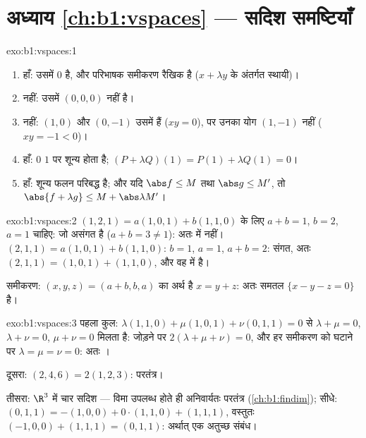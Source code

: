 \section*{अध्याय \ref{ch:b1:vspaces} --- सदिश समष्टियाँ}

\begin{solution}{exo:b1:vspaces:1}
\begin{enumerate}
  \item हाँ: उसमें $0$ है, और परिभाषक समीकरण रैखिक है ($x + \lambda y$ के
  अंतर्गत स्थायी)।
  \item नहीं: उसमें $(0,0,0)$ नहीं है।
  \item नहीं: $(1, 0)$ और $(0, -1)$ उसमें हैं ($xy = 0$), पर उनका योग $(1,
  -1)$ नहीं ($xy = -1 < 0$)।
  \item हाँ: $0$ $1$ पर शून्य होता है; $(P + \lambda Q)(1) = P(1) + \lambda
  Q(1) = 0$।
  \item हाँ: शून्य फलन परिबद्ध है; और यदि $\abs f \leq M$ तथा $\abs g \leq
  M'$, तो $\abs{f + \lambda g} \leq M + \abs\lambda M'$।
\end{enumerate}
\end{solution}

\begin{solution}{exo:b1:vspaces:2}
$(1,2,1) = a(1,0,1) + b(1,1,0)$ के लिए $a + b = 1$, $b = 2$, $a = 1$ चाहिए:
जो असंगत है ($a + b = 3 \neq 1$): अतः  में नहीं। $(2,1,1) =
a(1,0,1) + b(1,1,0)$: $b = 1$, $a = 1$, $a + b = 2$: संगत, अतः $(2,1,1) =
(1,0,1) + (1,1,0)$, और वह  में है।

समीकरण: $(x, y, z) = (a + b, b, a)$ का अर्थ है $x = y + z$: अतः 
समतल $\{x - y - z = 0\}$ है।
\end{solution}

\begin{solution}{exo:b1:vspaces:3}
पहला कुल: $\lambda(1,1,0) + \mu(1,0,1) + \nu(0,1,1) = 0$ से $\lambda + \mu =
0$, $\lambda + \nu = 0$, $\mu + \nu = 0$ मिलता है: जोड़ने पर $2(\lambda +
\mu + \nu) = 0$, और हर समीकरण को घटाने पर $\lambda = \mu = \nu = 0$: अतः
।

दूसरा: $(2,4,6) = 2(1,2,3)$: परतंत्र।

तीसरा: $\R^3$ में चार सदिश --- विमा उपलब्ध होते ही अनिवार्यतः परतंत्र
(\cref{ch:b1:findim}); सीधे: $(0,1,1) = -(1,0,0) + 0\cdot(1,1,0) + (1,1,1)$,
वस्तुतः $(-1,0,0) + (1,1,1) = (0,1,1)$: अर्थात् एक अतुच्छ संबंध।
\end{solution}


